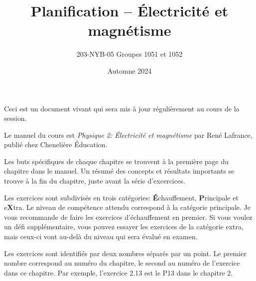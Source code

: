 \documentclass[10pt]{article}
\title{Planification -- Électricité et magnétisme}
\author{203-NYB-05  Groupes 1051 et 1052}
\date{Automne 2024}
\begin{document}
\makeatletter
\begin{center}
  {\LARGE \noindent\@title}
  \vspace{0.6em}

  {\large \noindent\@author}
  \vspace{0.2em}

  {\large \noindent\@date}
\end{center}
\vspace{2em}
\makeatother

\noindent Ceci est un document vivant qui sera mis à jour régulièrement au cours de la
session.

\vspace{1em}

\noindent Le manuel du cours est \emph{Physique 2: Électricité et magnétisme} par René
Lafrance, publié chez Chenelière Éducation.

\vspace{1em}

\noindent Les buts spécifiques de chaque chapitre se trouvent à la première
page du chapitre dans le manuel. Un résumé des concepts et résultats importants
se trouve à la fin du chapitre, juste avant la série d'excercices.

\vspace{1em}

\noindent Les exercices sont subdivisés en trois catégories:
\textbf{É}chauffement, \textbf{P}rincipale et e\textbf{X}tra. Le niveau de
compétence attendu correspond à la catégorie principale. Je vous recommande de
faire les exercices d'échauffement en premier. Si vous voulez un défi
supplémentaire, vous pouvez essayer les exercices de la catégorie extra, mais
ceux-ci vont au-delà du niveau qui sera évalué en examen.

\vspace{1em}

\noindent Les exercices sont identifiés par deux nombres séparés par un point.
Le premier nombre correspond au numéro du chapitre, le second au numéro de
l'exercice dans ce chapitre. Par exemple, l'exercice 2.13 est le P13 dans le
chapitre 2.
\end{document}
